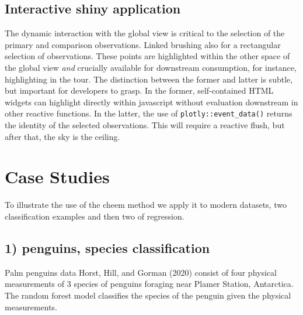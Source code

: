 \documentclass[
]{article}
\begin{document}
\hypertarget{interactive-shiny-application}{%
\subsection{Interactive shiny application}\label{interactive-shiny-application}}

The dynamic interaction with the global view is critical to the selection of the primary and comparison observations. Linked brushing also for a rectangular selection of observations. These points are highlighted within the other space of the global view \emph{and} crucially available for downstream consumption, for instance, highlighting in the tour. The distinction between the former and latter is subtle, but important for developers to grasp. In the former, self-contained HTML widgets can highlight directly within javascript without evaluation downstream in other reactive functions. In the latter, the use of \texttt{plotly::event\_data()} returns the identity of the selected observations. This will require a reactive flush, but after that, the sky is the ceiling.

\hypertarget{sec:casestudies}{%
\section{Case Studies}\label{sec:casestudies}}

To illustrate the use of the cheem method we apply it to modern datasets, two classification examples and then two of regression.

\hypertarget{penguins-species-classification}{%
\subsection{1) penguins, species classification}\label{penguins-species-classification}}

Palm penguins data Horst, Hill, and Gorman (2020) consist of four physical measurements of 3 species of penguins foraging near Plamer Station, Antarctica.
The random forest model classifies the species of the penguin given the physical measurements.
\end{document}
